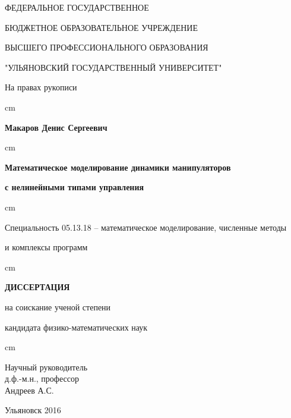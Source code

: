 \thispagestyle{empty}
\centerline{ФЕДЕРАЛЬНОЕ ГОСУДАРСТВЕННОЕ }
\centerline{БЮДЖЕТНОЕ ОБРАЗОВАТЕЛЬНОЕ УЧРЕЖДЕНИЕ}
\centerline{ВЫСШЕГО ПРОФЕССИОНАЛЬНОГО ОБРАЗОВАНИЯ}
\centerline{ "УЛЬЯНОВСКИЙ  ГОСУДАРСТВЕННЫЙ УНИВЕРСИТЕТ" }

\vglue 2cm
\par
\begin{flushright}
На правах рукописи
\end{flushright}


 cm \centerline{\bf Макаров Денис Сергеевич}

 cm \centerline{\bf Математическое моделирование динамики манипуляторов}
\centerline{\bf с нелинейными типами управления}


 cm \centerline{Специальность 05.13.18 -- математическое моделирование, численные методы}
\centerline{ и комплексы программ}
 cm \centerline{\bf ДИССЕРТАЦИЯ}
\vglue 0.5cm \centerline{ на соискание ученой степени}
\centerline{ кандидата физико-математических наук}  cm

\begin{flushright}
Научный руководитель  \\ 
д.ф.-м.н., профессор\\ 
Андреев А.С.\\
\end{flushright}

\vglue 1.5cm \centerline{Ульяновск  2016}

